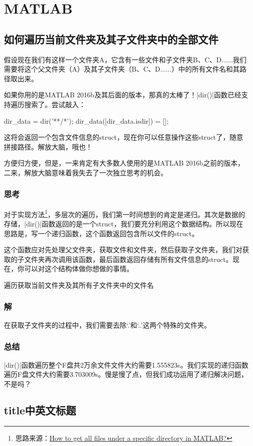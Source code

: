 \chapter{MATLAB}

\section{如何遍历当前文件夹及其子文件夹中的全部文件}

假设现在我们有这样一个文件夹A，它含有一些文件和子文件夹B、C、D......我们需要将这个父文件夹（A）及其子文件夹（B、C、D......）中的所有文件名和其路径取出来。

如果你用的是MATLAB 2016b及其后面的版本，那真的太棒了！\Matlabinline|dir()|函数已经支持遍历搜索了。尝试敲入：

\begin{Matlabcode}
dir_data = dir('**/*');
dir_data([dir_data.isdir]) = [];  %
\end{Matlabcode}

这将会返回一个包含文件信息的struct，现在你可以任意操作这些struct了，随意拼接路径。解放大脑，哦也！

方便归方便，但是，一来肯定有大多数人使用的是MATLAB 2016b之前的版本，二来，解放大脑意味着我失去了一次独立思考的机会。

\subsection*{思考}

对于实现方法\footnote{思路来源：\href{https://stackoverflow.com/questions/2652630/how-to-get-all-files-under-a-specific-directory-in-matlab}{How to get all files under a specific directory in MATLAB?}}，多层次的遍历，我们第一时间想到的肯定是递归。其次是数据的存储，\Matlabinline|dir()|函数返回的是一个struct，我们要充分利用这个数据结构。所以现在思路是，写一个递归函数，这个函数返回包含所以文件的struct。

这个函数应对先处理父文件夹，获取文件和文件夹，然后获取子文件夹，我们对获取的子文件夹再次调用该函数，最后函数返回存储有所有文件信息的struct。现在，你可以对这个结构体做你想做的事情。

\begin{algorithm}[H]


\caption{遍历获取当前文件夹及其所有子文件夹中的文件名}
\end{algorithm}

\subsection*{解}

在获取子文件夹的过程中，我们需要去除`.'和`..'这两个特殊的文件夹。


\subsection*{总结}
\Matlabinline|dir()|函数遍历整个F盘共2万余文件文件大约需要1.555823s。我们实现的递归函数遍历F盘文件大约需要3.703009s。慢是慢了点，但我们成功运用了递归解决问题，不是吗？

\section{title中英文标题}